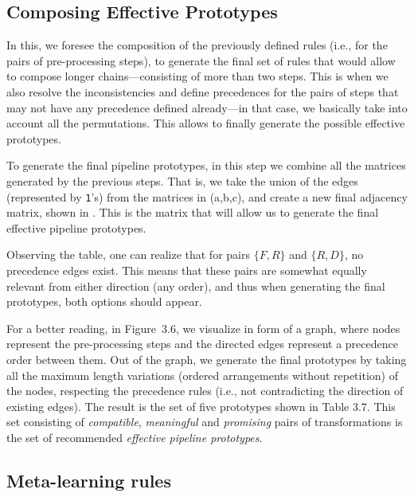 \subsection{Composing Effective Prototypes}
\label{effective-ssec:composition}
In this, we foresee the composition of the previously defined rules (i.e., for the pairs of pre-processing steps), to generate the final set of rules that would allow to compose longer chains---consisting of more than two steps.
This is when we also resolve the inconsistencies and define precedences for the pairs of steps that may not have any precedence defined already---in that case, we basically take into account all the permutations.
This allows to finally generate the possible effective  prototypes.

\begin{example}
To generate the final pipeline prototypes, in this step we combine all the matrices generated by the previous steps.
That is, we take the union of the edges (represented by \texttt{1}'s) from the matrices in  (a,b,c), and create a new final adjacency matrix, shown in .
This is the matrix that will allow us to generate the final effective pipeline prototypes.

Observing the table, one can realize that for pairs $\{F,R\}$ and $\{R,D\}$, no precedence edges exist.
This means that these pairs are somewhat equally relevant from either direction (any order), and thus when generating the final prototypes, both options should appear.

For a better reading, in Figure~3.6, we visualize  in form of a graph, where nodes represent the pre-processing steps and the directed edges represent a precedence order between them.
Out of the graph, we generate the final prototypes by taking all the maximum length variations (ordered arrangements without repetition) of the nodes, respecting the precedence rules (i.e., not contradicting the direction of existing edges).
The result is the set of five prototypes shown in Table 3.7. This set consisting of \textit{compatible}, \textit{meaningful} and \textit{promising} pairs of transformations is the set of recommended \textit{effective pipeline prototypes}.
\end{example}

\subsection{Meta-learning rules}
\label{effective-ssec:meta-learning}

